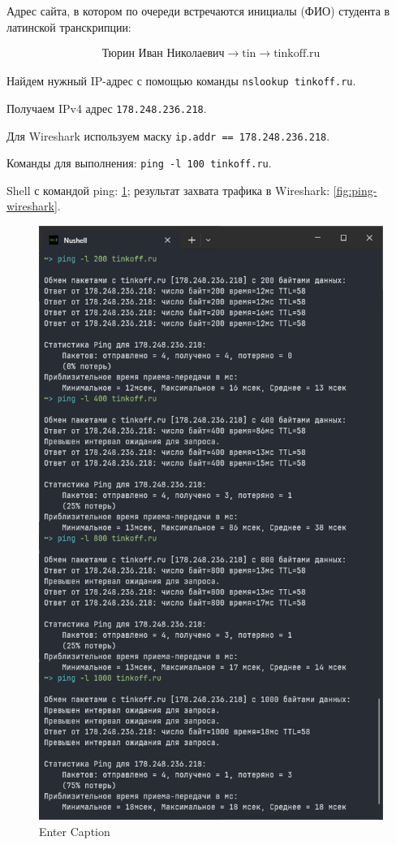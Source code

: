 Адрес сайта, в котором по очереди встречаются инициалы (ФИО) 
студента в латинской транскрипции:

\begin{align*}
    \text{Тюрин Иван Николаевич} \to\text{tin}  \to  \text{tinkoff.ru}
\end{align*}

Найдем нужный IP-адрес с помощью команды \verb|nslookup tinkoff.ru|.

Получаем IPv4 адрес \verb|178.248.236.218|.

Для Wireshark используем маску \verb|ip.addr == 178.248.236.218|\;.

\newpage
{}


Команды для выполнения: \verb|ping -l 100 tinkoff.ru|\;.

Shell с командой ping: \ref{fig:ping-shell}; результат захвата трафика в Wireshark: \ref{fig:ping-wireshark}.

\begin{figure}[h]
    \centering
    \includegraphics[width=0.8\linewidth]{res/ping-shell.png}
    \caption{Enter Caption}
    \label{fig:ping-shell}
\end{figure}

